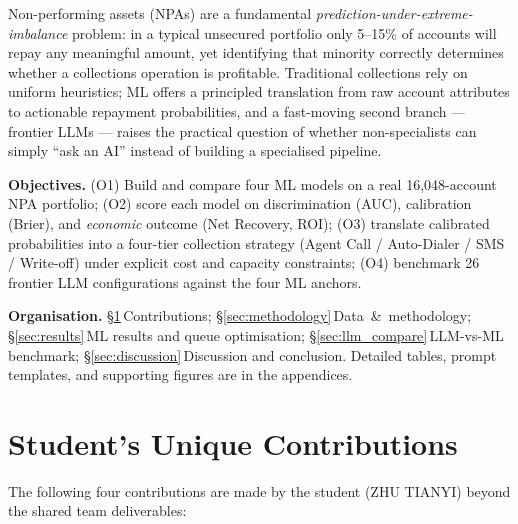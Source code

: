 \documentclass[11pt, a4paper]{article}
\begin{document}
Non-performing assets (NPAs) are a fundamental \emph{prediction-under-extreme-imbalance} problem: in a typical unsecured portfolio only 5--15\% of accounts will repay any meaningful amount, yet identifying that minority correctly determines whether a collections operation is profitable. Traditional collections rely on uniform heuristics; ML offers a principled translation from raw account attributes to actionable repayment probabilities, and a fast-moving second branch --- frontier LLMs --- raises the practical question of whether non-specialists can simply ``ask an AI'' instead of building a specialised pipeline.

\textbf{Objectives.}
(O1) Build and compare four ML models on a real 16{,}048-account NPA portfolio;
(O2) score each model on discrimination (AUC), calibration (Brier), and \emph{economic} outcome (Net Recovery, ROI);
(O3) translate calibrated probabilities into a four-tier collection strategy (Agent Call / Auto-Dialer / SMS / Write-off) under explicit cost and capacity constraints;
(O4) benchmark 26 frontier LLM configurations against the four ML anchors.

\textbf{Organisation.} \S\ref{sec:contribution}\,Contributions; \S\ref{sec:methodology}\,Data~\&~methodology; \S\ref{sec:results}\,ML results and queue optimisation; \S\ref{sec:llm_compare}\,LLM-vs-ML benchmark; \S\ref{sec:discussion}\,Discussion and conclusion. Detailed tables, prompt templates, and supporting figures are in the appendices.

\section{Student's Unique Contributions}\label{sec:contribution}

The following four contributions are made by the student (ZHU TIANYI) beyond the shared team deliverables:
\end{document}
